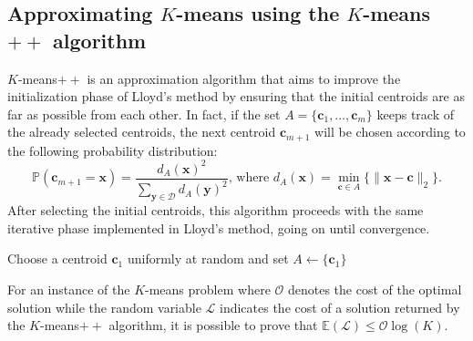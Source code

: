 \documentclass{report}
\begin{document}
\subsection{Approximating $K$-means using the $K$-means$++$ algorithm}
$\displaystyle K$-means$\displaystyle ++$ is an approximation algorithm that aims to improve the initialization phase of Lloyd's method by ensuring that the initial centroids are as far as possible from each other. \newline
In fact, if the set $\displaystyle A = \{\mathbf{c}_1, \dots, \mathbf{c}_m\}$ keeps track of the already selected centroids, the next centroid $\displaystyle \mathbf{c}_{m + 1}$ will be chosen according to the following probability distribution:
\[\mathbb{P}(\mathbf{c}_{m + 1} = \mathbf{x}) = \frac{d_A(\mathbf{x})^2}{\sum_{\mathbf{y} \in \mathcal{D}} d_A(\mathbf{y})^2} \text{, where $d_A(\mathbf{x}) = \min_{\mathbf{c} \in A}\{\lVert \mathbf{x} - \mathbf{c} \rVert_2\}$.}\]
After selecting the initial centroids, this algorithm proceeds with the same iterative phase implemented in Lloyd's method, going on until convergence.

\begin{algorithm}[H]
    \caption{The $\displaystyle K$-means$\displaystyle ++$ algorithm.}

    Choose a centroid $\displaystyle \mathbf{c}_1$ uniformly at random and set $\displaystyle A \gets \{\mathbf{c}_1\}$\;
    \;
\end{algorithm}
\noindent For an instance of the $\displaystyle K$-means problem where $\displaystyle \mathcal{O}$ denotes the cost of the optimal solution while the random variable $\displaystyle \mathcal{L}$ indicates the cost of a solution returned by the $\displaystyle K$-means$\displaystyle ++$ algorithm, it is possible to prove that $\displaystyle \mathbb{E}(\mathcal{L}) \leq \mathcal{O}\log(K)$.
\end{document}
